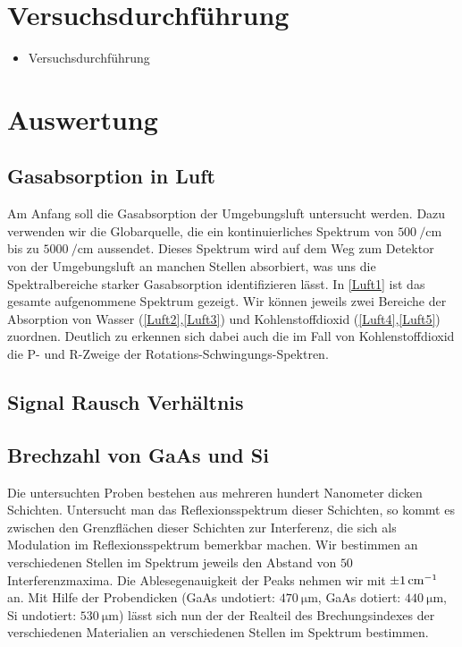 \documentclass[paper=a4,fontsize=10pt,DIV=18,twocolumn,parskip=half]{scrartcl}
\numberwithin{equation}{section}    %
\begin{document}

\section{Versuchsdurchführung}
\begin{itemize}
\item Versuchsdurchführung
\end{itemize}


\section{Auswertung}

\subsection{Gasabsorption in Luft}
Am Anfang soll die Gasabsorption der Umgebungsluft untersucht werden. 
Dazu verwenden wir die Globarquelle, die ein kontinuierliches Spektrum von $\SI{500}{\per\centi\meter}$ bis zu $\SI{5000}{\per\centi\meter}$ aussendet. 
Dieses Spektrum wird auf dem Weg zum Detektor von der Umgebungsluft an manchen Stellen absorbiert, was uns die Spektralbereiche starker Gasabsorption identifizieren lässt.
In \ref{Luft1} ist das gesamte aufgenommene Spektrum gezeigt. 
Wir können jeweils zwei Bereiche der Absorption von Wasser (\ref{Luft2},\ref{Luft3}) und Kohlenstoffdioxid (\ref{Luft4},\ref{Luft5}) zuordnen. 
Deutlich zu erkennen sich dabei auch die im Fall von Kohlenstoffdioxid die P- und R-Zweige der Rotations-Schwingungs-Spektren.

\subsection{Signal Rausch Verhältnis}

\subsection{Brechzahl von GaAs und Si}
Die untersuchten Proben bestehen aus mehreren hundert Nanometer dicken Schichten.
Untersucht man das Reflexionsspektrum dieser Schichten, so kommt es zwischen den Grenzflächen dieser Schichten zur Interferenz, die sich als Modulation im Reflexionsspektrum bemerkbar machen. 
Wir bestimmen an verschiedenen Stellen im Spektrum jeweils den Abstand von $50$ Interferenzmaxima. Die Ablesegenauigkeit der Peaks nehmen wir mit $\SI{\pm 1}{\centi\meter^{-1}}$ an.
Mit Hilfe der Probendicken (GaAs undotiert: $\SI{470}{\micro\meter}$, GaAs dotiert: $\SI{440}{\micro\meter}$, Si undotiert: $\SI{530}{\micro\meter}$) lässt sich nun der der Realteil des Brechungsindexes der verschiedenen Materialien an verschiedenen Stellen im Spektrum bestimmen.
\end{document}
